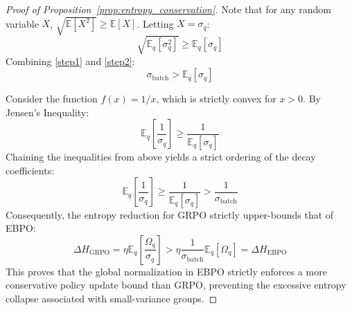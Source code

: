 \documentclass{article}
\theoremstyle{plain}
\theoremstyle{definition}
\theoremstyle{remark}
\begin{document}
\begin{proof}[Proof of Proposition~\ref{prop:entropy_conservation}]
Note that for any random variable $X$, $\sqrt{\mathbb{E}[X^2]} \geq \mathbb{E}[X]$. Letting $X = \sigma_q$:
\begin{equation}
    \sqrt{\mathbb{E}_q[\sigma_q^2]} \geq \mathbb{E}_q[\sigma_q] \label{step2}
\end{equation}
Combining \eqref{step1} and \eqref{step2}:
\begin{equation*}
    \sigma_{\text{batch}} > \mathbb{E}_q[\sigma_q]
\end{equation*}

Consider the function $f(x) = 1/x$, which is strictly convex for $x > 0$. By Jensen's Inequality:
\begin{equation*}
    \mathbb{E}_q \left[ \frac{1}{\sigma_q} \right] \geq \frac{1}{\mathbb{E}_q[\sigma_q]}
\end{equation*}
Chaining the inequalities from above yields a strict ordering of the decay coefficients:
\begin{equation*}
    \mathbb{E}_q \left[ \frac{1}{\sigma_q} \right] \geq \frac{1}{\mathbb{E}_q[\sigma_q]} > \frac{1}{\sigma_{\text{batch}}}
\end{equation*}
Consequently, the entropy reduction for GRPO strictly upper-bounds that of EBPO:
\begin{equation*}
    \Delta H_{\text{GRPO}} = \eta \mathbb{E}_q \left[ \frac{\Omega_q}{\sigma_q} \right] > \eta \frac{1}{\sigma_{\text{batch}}} \mathbb{E}_q [\Omega_q] = \Delta H_{\text{EBPO}}
\end{equation*}
This proves that the global normalization in EBPO strictly enforces a more conservative policy update bound than GRPO, preventing the excessive entropy collapse associated with small-variance groups.
\end{proof}
\end{document}
